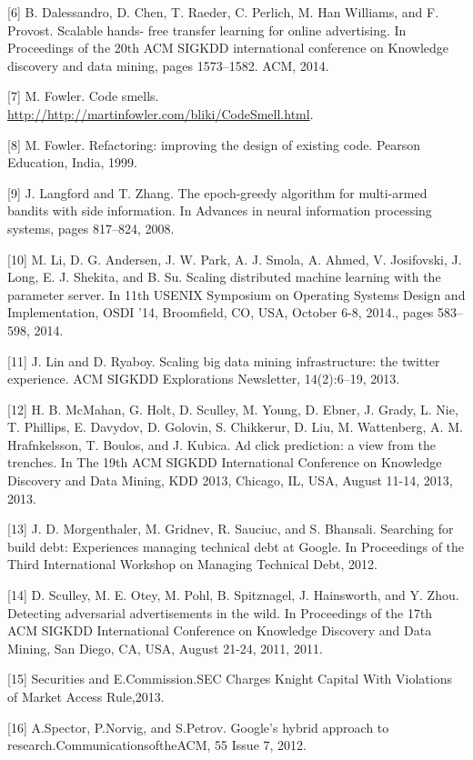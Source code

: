 \documentclass[]{article}
\begin{document}
{[}6{]} B. Dalessandro, D. Chen, T. Raeder, C. Perlich, M. Han Williams,
and F. Provost. Scalable hands- free transfer learning for online
advertising. In Proceedings of the 20th ACM SIGKDD international
conference on Knowledge discovery and data mining, pages 1573--1582.
ACM, 2014.

{[}7{]} M. Fowler. Code smells.
\url{http://http://martinfowler.com/bliki/CodeSmell.html}.

{[}8{]} M. Fowler. Refactoring: improving the design of existing code.
Pearson Education, India, 1999.

{[}9{]} J. Langford and T. Zhang. The epoch-greedy algorithm for
multi-armed bandits with side information. In Advances in neural
information processing systems, pages 817--824, 2008.

{[}10{]} M. Li, D. G. Andersen, J. W. Park, A. J. Smola, A. Ahmed, V.
Josifovski, J. Long, E. J. Shekita, and B. Su. Scaling distributed
machine learning with the parameter server. In 11th USENIX Symposium on
Operating Systems Design and Implementation, OSDI '14, Broomfield, CO,
USA, October 6-8, 2014., pages 583--598, 2014.

{[}11{]} J. Lin and D. Ryaboy. Scaling big data mining infrastructure:
the twitter experience. ACM SIGKDD Explorations Newsletter, 14(2):6--19,
2013.

{[}12{]} H. B. McMahan, G. Holt, D. Sculley, M. Young, D. Ebner, J.
Grady, L. Nie, T. Phillips, E. Davydov, D. Golovin, S. Chikkerur, D.
Liu, M. Wattenberg, A. M. Hrafnkelsson, T. Boulos, and J. Kubica. Ad
click prediction: a view from the trenches. In The 19th ACM SIGKDD
International Conference on Knowledge Discovery and Data Mining, KDD
2013, Chicago, IL, USA, August 11-14, 2013, 2013.

{[}13{]} J. D. Morgenthaler, M. Gridnev, R. Sauciuc, and S. Bhansali.
Searching for build debt: Experiences managing technical debt at Google.
In Proceedings of the Third International Workshop on Managing Technical
Debt, 2012.

{[}14{]} D. Sculley, M. E. Otey, M. Pohl, B. Spitznagel, J. Hainsworth,
and Y. Zhou. Detecting adversarial advertisements in the wild. In
Proceedings of the 17th ACM SIGKDD International Conference on Knowledge
Discovery and Data Mining, San Diego, CA, USA, August 21-24, 2011, 2011.

{[}15{]} Securities and E.Commission.SEC Charges Knight Capital With
Violations of Market Access Rule,2013.

{[}16{]} A.Spector, P.Norvig, and S.Petrov. Google's hybrid approach to
research.CommunicationsoftheACM, 55 Issue 7, 2012.
\end{document}
